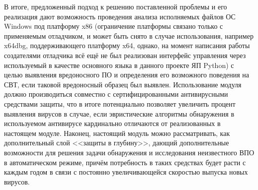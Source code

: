В итоге, предложенный подход к решению поставленной проблемы и его реализация дают возможность проведения анализа исполняемых файлов ОС Windows под платформу x86 (ограничение платформы связано только с применяемым отладчиком, и может быть снято в случае использования, например x64dbg, поддерживающего платформу x64, однако, на момент написания работы создателями отладчика всё ещё не был реализован интерфейс управления через используемый в качестве основного языка в данного проекте ЯП Python) с целью выявления вредоносного ПО и определения его возможного поведения на СВТ, если таковой вредоносный образец был выявлен. Использование модуля должно производиться совместно с сертифицированными антивирусными средствами защиты, что в итоге потенциально позволяет увеличить процент выявления вирусов в случае, если эвристические алгоритмы обнаружения в используемом антивирусе кардинально отличаются от реализованных в настоящем модуле. Наконец, настоящий модуль можно рассматривать, как дополнительный слой <<защиты в глубину>>, дающий дополнительные возможности для решения задачи обнаружения и исследования неизвестного ВПО в автоматическом режиме, причём потребность в таких средствах будет расти с каждым годом в связи с постоянно увеличивающейся скоростью выпуска новых вирусов.